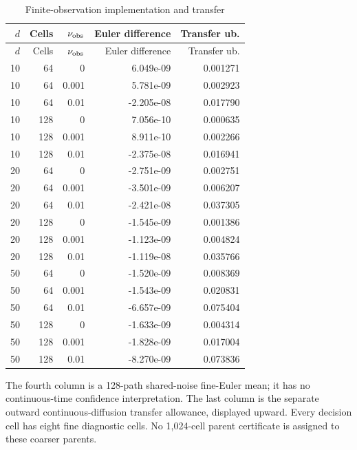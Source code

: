 \begingroup\small\setlength{\tabcolsep}{4pt}
\begin{longtable}{rrrrr}
\caption{Finite-observation implementation and transfer}\label{tab:r14sensing}\\
\toprule
$d$ & Cells & $\nu_{\rm obs}$ & Euler difference & Transfer ub.\\\midrule
\endfirsthead
\toprule
$d$ & Cells & $\nu_{\rm obs}$ & Euler difference & Transfer ub.\\\midrule
\endhead
10 & 64 & 0 & 6.049e-09 & 0.001271\\
10 & 64 & 0.001 & 5.781e-09 & 0.002923\\
10 & 64 & 0.01 & -2.205e-08 & 0.017790\\
10 & 128 & 0 & 7.056e-10 & 0.000635\\
10 & 128 & 0.001 & 8.911e-10 & 0.002266\\
10 & 128 & 0.01 & -2.375e-08 & 0.016941\\
20 & 64 & 0 & -2.751e-09 & 0.002751\\
20 & 64 & 0.001 & -3.501e-09 & 0.006207\\
20 & 64 & 0.01 & -2.421e-08 & 0.037305\\
20 & 128 & 0 & -1.545e-09 & 0.001386\\
20 & 128 & 0.001 & -1.123e-09 & 0.004824\\
20 & 128 & 0.01 & -1.119e-08 & 0.035766\\
50 & 64 & 0 & -1.520e-09 & 0.008369\\
50 & 64 & 0.001 & -1.543e-09 & 0.020831\\
50 & 64 & 0.01 & -6.657e-09 & 0.075404\\
50 & 128 & 0 & -1.633e-09 & 0.004314\\
50 & 128 & 0.001 & -1.828e-09 & 0.017004\\
50 & 128 & 0.01 & -8.270e-09 & 0.073836\\
\bottomrule
\end{longtable}
\noindent The fourth column is a 128-path shared-noise fine-Euler mean; it has no continuous-time confidence interpretation. The last column is the separate outward continuous-diffusion transfer allowance, displayed upward. Every decision cell has eight fine diagnostic cells. No 1,024-cell parent certificate is assigned to these coarser parents.
\endgroup
